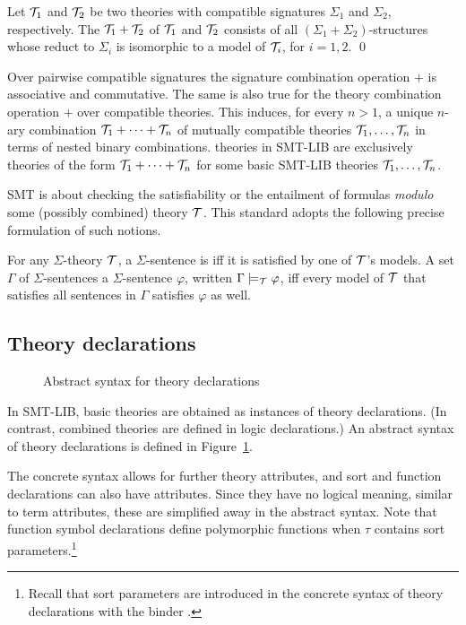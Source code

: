 \begin{definition}
\label{def:theorycomb}
Let $\mathcal{T}_1$ and $\mathcal{T}_2$ be two theories 
with compatible signatures $\Sigma_1$ and $\Sigma_2$, respectively. 
The  $\mathcal{T}_1 + \mathcal{T}_2$ of $\mathcal{T}_1$ and $\mathcal{T}_2$
consists of all $(\Sigma_1+\Sigma_2)$-structures
whose reduct to $\Sigma_i$ is isomorphic to a model of $\mathcal{T}_i$,
for $i=1,2$.
\qed
\end{definition}

Over pairwise compatible signatures
the signature combination operation $+$ is associative and commutative.
The same is also true for the theory combination operation $+$ over
compatible theories.
This induces, for every $n > 1$,
a unique $n$-ary combination $\mathcal{T}_1 + \cdots + \mathcal{T}_n$ 
of mutually compatible theories $\mathcal{T}_1,\ldots,\mathcal{T}_n$
in terms of nested binary combinations.
 theories in SMT-LIB are exclusively
theories of the form $\mathcal{T}_1 + \cdots + \mathcal{T}_n$ 
for some basic SMT-LIB theories $\mathcal{T}_1,\ldots,\mathcal{T}_n$.

SMT is about checking the satisfiability or the entailment 
of formulas \emph{modulo} some (possibly combined) theory $\mathcal{T}$.
This standard adopts the following precise formulation of such notions.

\begin{definition}
For any $\Sigma$-theory $\mathcal{T}$,
a $\Sigma$-sentence is 
iff it is satisfied by one of $\mathcal{T}$'s models.
A set $\Gamma$ of $\Sigma$-sentences
 a $\Sigma$-sentence $\varphi$,
written $\Gamma \models_{\mathcal{T}} \varphi$,
iff every model of $\mathcal{T}$ that satisfies all sentences in $\Gamma$
satisfies $\varphi$ as well.
\end{definition}


\subsection{Theory declarations} \label{sec:theory-decl}

\begin{figure}[t]
\theories
\caption{Abstract syntax for theory declarations}
\label{fig:theory-declaration}
\end{figure}

In SMT-LIB, basic theories are obtained as instances of theory declarations.
(In contrast, combined theories are defined in logic declarations.)
An abstract syntax of theory declarations is defined in 
Figure~\ref{fig:theory-declaration}.
\begin{newver}
The concrete syntax allows for further
theory attributes, and sort and function declarations can also have
attributes.  Since they have no logical meaning, similar to term attributes,
these are simplified away in the abstract syntax.  Note that function symbol
declarations define polymorphic functions
when $\tau$ contains sort parameters.\footnote{%
Recall that sort parameters are introduced
in the concrete syntax of theory declarations with the binder .
}
\end{newver}

